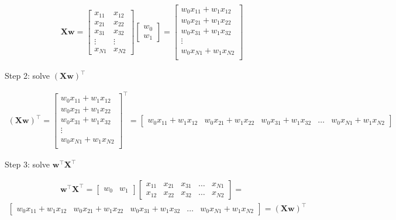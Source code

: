 \documentclass[10pt]{article}
\begin{document}
\begin{enumerate}
\begin{eqnarray*}
\mathbf{X}\mathbf{w} = 
	\begin{bmatrix}
	x_{11} & x_{12} \\[0.3em]
    x_{21} & x_{22} \\[0.3em]
    x_{31} & x_{32} \\[0.3em]
    \vdots & \vdots \\[0.3em]
    x_{N1} & x_{N2}
	\end{bmatrix}
    \begin{bmatrix}
    w_0 \\[0.3em]
    w_1
    \end{bmatrix} =
    \begin{bmatrix}
    w_0x_{11} + w_1x_{12} \\[0.3em]
    w_0x_{21} + w_1x_{22} \\[0.3em]
    w_0x_{31} + w_1x_{32} \\[0.3em]
    \vdots \\[0.3em]
    w_0x_{N1} + w_1x_{N2} \\[0.3em]
    \end{bmatrix}
\end{eqnarray*}

Step 2: solve $(\mathbf{X}\mathbf{w})^\top$

\begin{eqnarray*}
(\mathbf{X}\mathbf{w})^\top = 
\begin{bmatrix}
    w_0x_{11} + w_1x_{12} \\[0.3em]
    w_0x_{21} + w_1x_{22} \\[0.3em]
    w_0x_{31} + w_1x_{32} \\[0.3em]
    \vdots \\[0.3em]
    w_0x_{N1} + w_1x_{N2} \\[0.3em]
    \end{bmatrix}^\top =
    \begin{bmatrix}
    w_0x_{11} + w_1x_{12} &
    w_0x_{21} + w_1x_{22} &
    w_0x_{31} + w_1x_{32} &
    \dots &
    w_0x_{N1} + w_1x_{N2}
    \end{bmatrix}
\end{eqnarray*}

Step 3: solve ${\mathbf{w}}^\top{\mathbf{X}}^\top$

\begin{eqnarray*}
{\mathbf{w}}^\top{\mathbf{X}}^\top = 
    \begin{bmatrix}
	w_0 & w_1
    \end{bmatrix}
    \begin{bmatrix}
    x_{11} & x_{21} & x_{31} & \dots & x_{N1} \\[0.3em]
    x_{12} & x_{22} & x_{32} & \dots & x_{N2}
    \end{bmatrix} =
\end{eqnarray*}
\begin{eqnarray*}
   	\begin{bmatrix}
    w_0x_{11} + w_1x_{12} &
    w_0x_{21} + w_1x_{22} &
    w_0x_{31} + w_1x_{32} &
    \dots &
    w_0x_{N1} + w_1x_{N2}
    \end{bmatrix} = 
    (\mathbf{X}\mathbf{w})^\top
\end{eqnarray*}



\end{enumerate}
\end{document}

